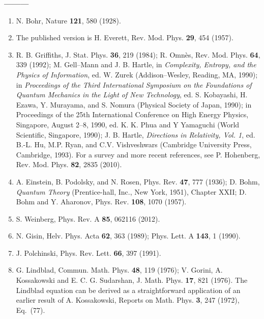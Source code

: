 \vspace{20pt}



\begin{center}
{\bf ---------}
\end{center}

\vspace{10pt}

\begin{enumerate}

\item N. Bohr, Nature {\bf 121}, 580 (1928).
\item The published version is H. Everett, Rev. Mod. Phys. {\bf 29}, 454 (1957).
 \item R. B. Griffiths, J. Stat. Phys. {\bf 36}, 219 (1984); R. Omn\`{e}s, Rev. Mod. Phys. {\bf 64}, 339 (1992); M. Gell--Mann and J. B. Hartle, in {\em Complexity, Entropy, and the Physics of Information}, ed. W. Zurek (Addison--Wesley, Reading, MA, 1990); in {\em Proceedings of the Third International Symposium on the Foundations of Quantum Mechanics in the Light of New Technology}, ed. S. Kobayashi, H. Ezawa, Y. Murayama, and S. Nomura (Physical Society of Japan, 1990); in {Proceedings of the 25th International Conference on High Energy Physics, Singapore, August 2--8, 1990}, ed. K. K. Phua and Y Yamaguchi (World Scientific, Singapore, 1990); J. B. Hartle, {\em Directions in Relativity, Vol. 1}, ed. B.-L. Hu, M.P. Ryan, and C.V. Vishveshwars (Cambridge University Press, Cambridge, 1993).  For a survey and more recent references, see P. Hohenberg, Rev. Mod. Phys. {\bf 82}, 2835 (2010).
  \item A. Einstein, B. Podolsky, and N. Rosen, Phys. Rev. {\bf 47}, 777 (1936); D. Bohm, {\em Quantum Theory} (Prentice-hall, Inc., New York, 1951), Chapter XXII; D. Bohm and Y. Aharonov, Phys. Rev. {\bf 108}, 1070 (1957).            
 \item  S. Weinberg, Phys. Rev. A {\bf 85}, 062116 (2012). 
\item N. Gisin, Helv. Phys. Acta {\bf 62}, 363 (1989); Phys. Lett. A {\bf 143}, 1 (1990).  
\item  J. Polchinski, Phys. Rev. Lett. {\bf 66}, 397 (1991).
\item G. Lindblad, Commun. Math. Phys. {\bf 48}, 119 (1976); V. Gorini, A. Kossakowski and E. C. G. Sudarshan, J. Math. Phys. {\bf 17}, 821 (1976).  The Lindblad equation can be derived as a straightforward application of an earlier result of A. Kossakowski, Reports on Math.  Phys. {\bf 3}, 247 (1972), Eq.~(77).

\end{enumerate}
